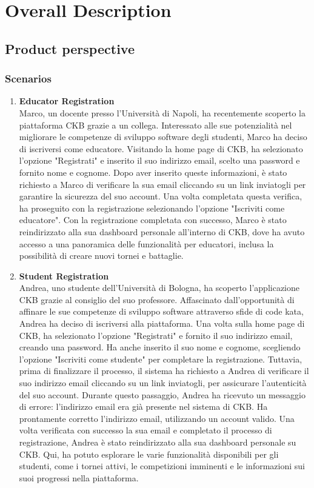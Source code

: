 \section{Overall Description}\label{intro}
\subsection{Product perspective}
\subsubsection{Scenarios}
\begin{enumerate}[label=\textbf{\Alph*}.]
    \item  \textbf{Educator Registration} \\
    Marco, un docente presso l'Università di Napoli, ha recentemente scoperto la piattaforma CKB grazie a un collega. Interessato alle sue potenzialità nel migliorare le competenze di sviluppo software degli studenti, Marco ha deciso di iscriversi come educatore. Visitando la home page di CKB, ha selezionato l'opzione "Registrati" e inserito il suo indirizzo email, scelto una password e fornito nome e cognome. Dopo aver inserito queste informazioni, è stato richiesto a Marco di verificare la sua email cliccando su un link inviatogli per garantire la sicurezza del suo account. Una volta completata questa verifica, ha proseguito con la registrazione selezionando l'opzione "Iscriviti come educatore". Con la registrazione completata con successo, Marco è stato reindirizzato alla sua dashboard personale all'interno di CKB, dove ha avuto accesso a una panoramica delle funzionalità per educatori, inclusa la possibilità di creare nuovi tornei e battaglie.
\item  \textbf{Student Registration} \\
Andrea, uno studente dell'Università di Bologna, ha scoperto l'applicazione CKB grazie al consiglio del suo professore. Affascinato dall'opportunità di affinare le sue competenze di sviluppo software attraverso sfide di code kata, Andrea ha deciso di iscriversi alla piattaforma. Una volta sulla home page di CKB, ha selezionato l'opzione "Registrati" e fornito il suo indirizzo email, creando una password. Ha anche inserito il suo nome e cognome, scegliendo l'opzione "Iscriviti come studente" per completare la registrazione. Tuttavia, prima di finalizzare il processo, il sistema ha richiesto a Andrea di verificare il suo indirizzo email cliccando su un link inviatogli, per assicurare l'autenticità del suo account. Durante questo passaggio, Andrea ha ricevuto un messaggio di errore: l'indirizzo email era già presente nel sistema di CKB. Ha prontamente corretto l'indirizzo email, utilizzando un account valido. Una volta verificata con successo la sua email e completato il processo di registrazione, Andrea è stato reindirizzato alla sua dashboard personale su CKB. Qui, ha potuto esplorare le varie funzionalità disponibili per gli studenti, come i tornei attivi, le competizioni imminenti e le informazioni sui suoi progressi nella piattaforma.

\end{enumerate}
